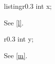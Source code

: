 \documentclass{article}
\begin{document}
\begin{wrapfloat}{listing}{r}{0.3\textwidth}
int x;
\caption{Code.}\label{l}
\end{wrapfloat}
See \ref{l}.
\begin{wrapprogram}{r}{0.3\textwidth}
int y;
\caption{More.}\label{m}
\end{wrapprogram}
See \ref{m}.
\end{document}
